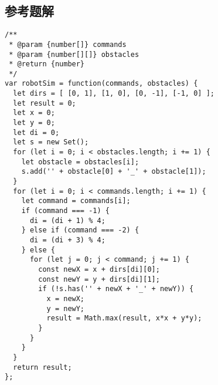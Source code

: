 \subsection{参考题解}

\begin{verbatim}
/**
 * @param {number[]} commands
 * @param {number[][]} obstacles
 * @return {number}
 */
var robotSim = function(commands, obstacles) {
  let dirs = [ [0, 1], [1, 0], [0, -1], [-1, 0] ];
  let result = 0;
  let x = 0;
  let y = 0;
  let di = 0;
  let s = new Set();
  for (let i = 0; i < obstacles.length; i += 1) {
    let obstacle = obstacles[i];
    s.add('' + obstacle[0] + '_' + obstacle[1]);
  }
  for (let i = 0; i < commands.length; i += 1) {
    let command = commands[i];
    if (command === -1) {
      di = (di + 1) % 4;
    } else if (command === -2) {
      di = (di + 3) % 4;
    } else {
      for (let j = 0; j < command; j += 1) {
        const newX = x + dirs[di][0];
        const newY = y + dirs[di][1];
        if (!s.has('' + newX + '_' + newY)) {
          x = newX;
          y = newY;
          result = Math.max(result, x*x + y*y);
        }
      }
    }
  }
  return result;
};  
\end{verbatim}
